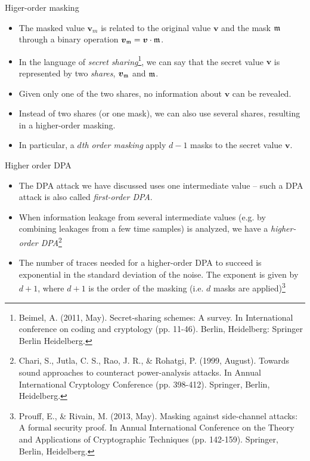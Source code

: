 \begin{frame}{Higer-order masking}
    \begin{itemize}
        \item The masked value $\boldsymbol{v}_m$ is related to the original value $\boldsymbol{v}$ and the mask ${\mathfrak m}$ through a binary operation $\boldsymbol{v}_{{\mathfrak m}}=\boldsymbol{v}\cdot{\mathfrak m}$.
        \item In the language of \textit{secret sharing}\footnote{Beimel, A. (2011, May). Secret-sharing schemes: A survey. In International conference on coding and cryptology (pp. 11-46). Berlin, Heidelberg: Springer Berlin Heidelberg.}, we can say that the secret value $\boldsymbol{v}$ is represented by two \textit{shares}, $\boldsymbol{v}_{{\mathfrak m}}$ and ${\mathfrak m}$.
       \item Given only one of the two shares, no information about $\boldsymbol{v}$ can be revealed.
      \item Instead of two shares (or one mask), we can also use several shares, resulting in a higher-order masking.
      \item In particular, a \textit{$d$th order masking} apply $d-1$ masks to the secret value $\boldsymbol{v}$.
    \end{itemize}
\end{frame}

\begin{frame}{Higher order DPA}
    \begin{itemize}
        \item The DPA attack we have discussed uses one intermediate value -- such a DPA attack is also called \textit{first-order DPA}.
        \item When information leakage from several intermediate values (e.g. by combining leakages from a few time samples) is analyzed, we have a \textit{higher-order DPA}\footnote{Chari, S., Jutla, C. S., Rao, J. R., \& Rohatgi, P. (1999, August). Towards sound approaches to counteract power-analysis attacks. In Annual International Cryptology Conference (pp. 398-412). Springer, Berlin, Heidelberg.}
        \item The number of traces needed for a higher-order DPA to succeed is exponential in the standard deviation of the noise.
The exponent is given by $d+1$, where $d+1$ is the order of the masking (i.e. $d$ masks are applied)\footnote{Prouff, E., \& Rivain, M. (2013, May). Masking against side-channel attacks: A formal security proof. In Annual International Conference on the Theory and Applications of Cryptographic Techniques (pp. 142-159). Springer, Berlin, Heidelberg.}
    \end{itemize}
\end{frame}

